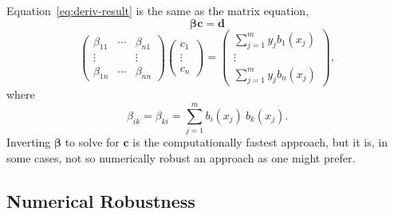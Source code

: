 \documentclass[twocolumn]{article}
\begin{document}
Equation~\ref{eq:deriv-result} is the same as the matrix equation,
\begin{equation}
   \boldsymbol{\beta} \mathbf{c} = \mathbf{d}
   \label{eq:beta}
\end{equation}
\begin{equation}
   \begin{pmatrix}
      \beta_{11} & \cdots & \beta_{n1}\\
      \vdots & & \vdots\\
      \beta_{1n} & \cdots & \beta_{nn}
   \end{pmatrix}
   \begin{pmatrix}
      c_1\\
      \vdots\\
      c_n
   \end{pmatrix}
   =
   \begin{pmatrix}
      \sum_{j=1}^{m} y_j b_1(x_j)\\
      \vdots\\
      \sum_{j=1}^{m} y_j b_n(x_j)
   \end{pmatrix},
\end{equation}
where
\begin{equation}
   \beta_{ik} = \beta_{ki} = \sum_{j=1}^m b_i(x_j) \: b_k(x_j).
\end{equation}
Inverting $\boldsymbol{\beta}$ to solve for $\mathbf{c}$ is the computationally
fastest approach, but it is, in some cases, not so numerically robust an
approach as one might prefer.

\subsection{Numerical Robustness}
\end{document}
